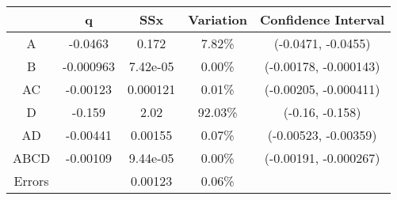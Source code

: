\begin{center}
\begin{tabular}{|c|c|c|c|c|}
\cline{2-5}
\multicolumn{1}{c|}{} & q & SSx & Variation & Confidence Interval \\
\hline
A&-0.0463&0.172&7.82\% &(-0.0471, -0.0455) \\
\hline
B&-0.000963&7.42e-05&0.00\% &(-0.00178, -0.000143) \\
\hline
AC&-0.00123&0.000121&0.01\% &(-0.00205, -0.000411) \\
\hline
D&-0.159&2.02&92.03\% &(-0.16, -0.158) \\
\hline
AD&-0.00441&0.00155&0.07\% &(-0.00523, -0.00359) \\
\hline
ABCD&-0.00109&9.44e-05&0.00\% &(-0.00191, -0.000267) \\
\hline
Errors& &0.00123&0.06\% & \\
\hline
\end{tabular}
\end{center}
